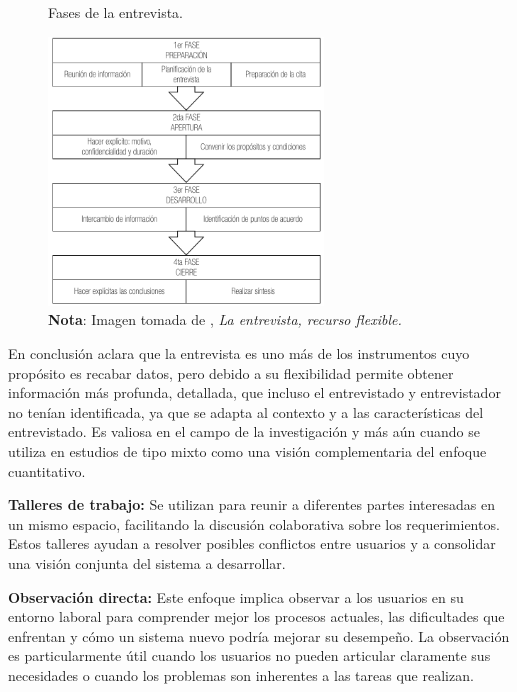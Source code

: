 		\begin{figure}[h] %
			\caption[Fases de la entrevista]
			{\newline Fases de la entrevista.} %
			\vspace{0.3cm}
			\centering
			\includegraphics[width=0.65\textwidth]{imagenes/figura2_2.png} %
			\vspace{0.3cm}
			\caption*{\textup{\textbf{Nota}: Imagen tomada de \textcite{diaz2013entrevista}, \textit{La entrevista, recurso flexible.}}}
			\vspace{-0.6cm}
			\label{fig:figura2_2} %
		\end{figure}
		
		En conclusión \textcite{diaz2013entrevista} aclara que la entrevista es uno más de los instrumentos cuyo propósito es recabar datos, pero debido a su flexibilidad permite obtener información más profunda, detallada, que incluso el entrevistado y entrevistador no tenían identificada, ya que se adapta al contexto y a las características del entrevistado. Es valiosa en el campo de la investigación y más aún cuando se utiliza en estudios de tipo mixto como una visión complementaria del enfoque cuantitativo.
						
		\textbf{Talleres de trabajo:} Se utilizan para reunir a diferentes partes interesadas en un mismo espacio, facilitando la discusión colaborativa sobre los requerimientos. Estos talleres ayudan a resolver posibles conflictos entre usuarios y a consolidar una visión conjunta del sistema a desarrollar.
		
		\textbf{Observación directa:} Este enfoque implica observar a los usuarios en su entorno laboral para comprender mejor los procesos actuales, las dificultades que enfrentan y cómo un sistema nuevo podría mejorar su desempeño. La observación es particularmente útil cuando los usuarios no pueden articular claramente sus necesidades o cuando los problemas son inherentes a las tareas que realizan.
		
